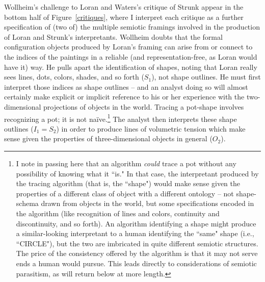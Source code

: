 Wollheim's challenge to Loran and Waters's critique of Strunk appear in the bottom half of Figure~\ref{critiques}, where I interpret each critique as a further specification of (two of) the multiple semiotic framings involved in the production of Loran and Strunk's interpretants.  Wollheim doubts that the formal configuration objects produced by Loran's framing can arise from or connect to the indices of the paintings in a reliable (and representation-free, as Loran would have it) way.  He pulls apart the identification of shapes, noting that Loran really sees lines, dots, colors, shades, and so forth ($S_1$), not shape outlines. He must first interpret those indices as shape outlines -- and an analyst doing so will almost certainly make explicit or implicit reference to his or her experience with the two-dimensional projections of objects in the world.  Tracing a pot-shape involves recognizing a pot; it is not na\"{i}ve.\footnote{I note in passing here that an algorithm \emph{could} trace a pot without any possibility of knowing what it ``is."  In that case, the interpretant produced by the tracing algorithm (that is, the ``shape") would make sense given the properties of a different class of object with a different ontology -- not shape-schema drawn from objects in the world, but some specifications encoded in the algorithm (like recognition of lines and colors, continuity and discontinuity, and so forth).  An algorithm identifying a shape might produce a similar-looking interpretant to a human identifying the ``same" shape (i.e., ``CIRCLE"), but the two are imbricated in quite different semiotic structures.  The price of the consistency offered by the algorithm is that it may not serve ends a human would pursue.  This leads directly to considerations of semiotic parasitism, as will return below at more length.} The analyst then interprets these shape outlines ($I_1 = S_2$) in order to produce lines of volumetric tension which make sense given the properties of three-dimensional objects in general ($O_2$).


